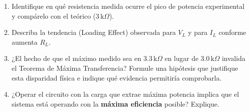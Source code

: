 \documentclass[11pt, a4paper]{article}
\begin{document}
\begin{enumerate}
    \item Identifique en qué resistencia medida ocurre el pico de potencia experimental y compárelo con el teórico ($3\,\text{k}\Omega$).
    \item Describa la tendencia (Loading Effect) observada para $V_L$ y para $I_L$ conforme aumenta $R_L$.
    \item ¿El hecho de que el máximo medido sea en $3.3\,\text{k}\Omega$ en lugar de $3.0\,\text{k}\Omega$ invalida el Teorema de Máxima Transferencia? Formule una hipótesis que justifique esta disparidad física e indique qué evidencia permitiría comprobarla.
    \item ¿Operar el circuito con la carga que extrae máxima potencia implica que el sistema está operando con la \textbf{máxima eficiencia} posible? Explique.
\end{enumerate}
\end{document}

